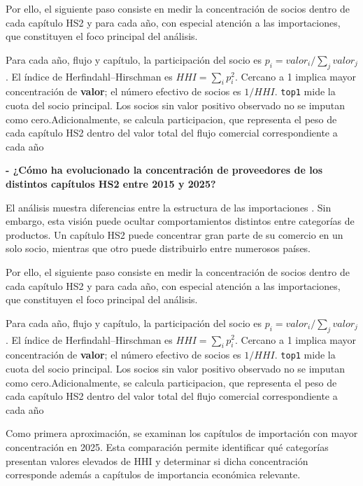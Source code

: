 \documentclass[
]{article}
\begin{document}
Por ello, el siguiente paso consiste en medir la concentración de socios
dentro de cada capítulo HS2 y para cada año, con especial atención a las
importaciones, que constituyen el foco principal del análisis.

Para cada año, flujo y capítulo, la participación del socio es
\(p_i = valor_i / \sum_j valor_j\). El índice de Herfindahl--Hirschman
es \(HHI = \sum_i p_i^2\). Cercano a 1 implica mayor concentración de
\textbf{valor}; el número efectivo de socios es \(1/HHI\). \texttt{top1}
mide la cuota del socio principal. Los socios sin valor positivo
observado no se imputan como cero.Adicionalmente, se calcula
participacion, que representa el peso de cada capítulo HS2 dentro del
valor total del flujo comercial correspondiente a cada año

\textbf{- ¿Cómo ha evolucionado la concentración de proveedores de los
distintos capítulos HS2 entre 2015 y 2025?}

El análisis muestra diferencias entre la estructura de las importaciones
. Sin embargo, esta visión puede ocultar comportamientos distintos entre
categorías de productos. Un capítulo HS2 puede concentrar gran parte de
su comercio en un solo socio, mientras que otro puede distribuirlo entre
numerosos países.

Por ello, el siguiente paso consiste en medir la concentración de socios
dentro de cada capítulo HS2 y para cada año, con especial atención a las
importaciones, que constituyen el foco principal del análisis.

Para cada año, flujo y capítulo, la participación del socio es
\(p_i = valor_i / \sum_j valor_j\). El índice de Herfindahl--Hirschman
es \(HHI = \sum_i p_i^2\). Cercano a 1 implica mayor concentración de
\textbf{valor}; el número efectivo de socios es \(1/HHI\). \texttt{top1}
mide la cuota del socio principal. Los socios sin valor positivo
observado no se imputan como cero.Adicionalmente, se calcula
participacion, que representa el peso de cada capítulo HS2 dentro del
valor total del flujo comercial correspondiente a cada año

Como primera aproximación, se examinan los capítulos de importación con
mayor concentración en 2025. Esta comparación permite identificar qué
categorías presentan valores elevados de HHI y determinar si dicha
concentración corresponde además a capítulos de importancia económica
relevante.
\end{document}
